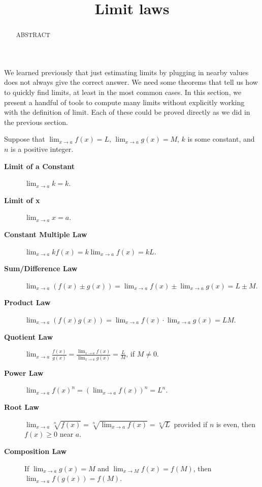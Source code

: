 \documentclass{ximera}
\title{Limit laws}
\begin{document}
\begin{abstract}
ABSTRACT
\end{abstract}
\maketitle

We learned previously that just estimating limits by plugging in
nearby values does not always give the correct answer.  We need some
theorems that tell us how to quickly find limits, at least in the most
common cases.  In this section, we present a handful of tools to
compute many limits without explicitly working with the definition of
limit. Each of these could be proved directly as we did in the
previous section.

\begin{theorem}\label{theorem:limit-laws}
Suppose that $\lim_{x\to a}f(x)=L$, $\lim_{x\to a}g(x)=M$, $k$
is some constant, and $n$ is a positive integer.
\begin{description}
\item[\textbf{Limit of a Constant}] $\lim_{x\to a} k = k$.
\item[\textbf{Limit of x}] $\lim_{x\to a}x =a$.
\item[\textbf{Constant Multiple Law}] $\lim_{x\to a} kf(x) = k\lim_{x\to a}f(x)=kL$.
\item[\textbf{Sum/Difference Law}] $\lim_{x\to a} (f(x) \pm g(x)) = \lim_{x\to a}f(x) \pm \lim_{x\to a}g(x)=L \pm M$.  
\item[\textbf{Product Law}] $\lim_{x\to a} (f(x)g(x)) = \lim_{x\to a}f(x)\cdot\lim_{x\to a}g(x)=LM$. 
\item[\textbf{Quotient Law}] $\lim_{x\to a} \frac{f(x)}{g(x)} =
  \frac{\lim_{x\to a}f(x)}{\lim_{x\to a}g(x)}=\frac{L}{M}$, if $M\ne0$.
\item[\textbf{Power Law}] $\lim_{x\to a} f(x)^n = \left(\lim_{x\to a}f(x)\right)^n=L^n$.
\item[\textbf{Root Law}] $\lim_{x\to a} \sqrt[n]{f(x)} = \sqrt[n]{\lim_{x\to
    a}f(x)}=\sqrt[n]{L}$ provided if $n$ is even, then $f(x)\ge 0$
  near $a$.
\item[\textbf{Composition Law}] If $\lim_{x\to a}g(x)=M$ and
  $\lim_{x\to M}f(x) = f(M)$, then $\lim_{x\to a} f(g(x)) = f(M)$.
\end{description}
\label{thm:limit laws}
\end{theorem}
\end{document}

